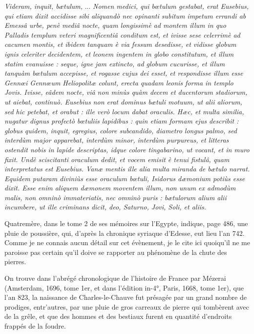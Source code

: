\documentclass[a4paper, 12pt, oneside, french]{article}
\begin{document}
\og \emph{Videram, inquit, bætulum,} ... \emph{Nomen medici, qui bœtulum gestabat, erat Eusebius, qui etiam dixit accidisse sibi aliquandò nec opinanti subitum impetum errandi ab Emessâ urbe, penè mediâ nocte, quam longissimè ad montem illum in quo Palladis templum veteri magnificentiâ conditum est, et ivisse sese celerrimè ad cacumen montis, et ibidem tanquam è via fessum desedisse, et vidisse globum ignis celeriter decidentem, et leonem ingentem in globo constitutum, et illum statim evanuisse : seque, igne jam extincto, ad globum cucurisse, et illum tanquàm bœtulum accepisse, et rogasse cujus dei esset, et respondisse illum esse Gennœi Gennœum Heliopolitæ colunt, erecta quadam leonis forma in templo Jovis. Ivisse, eâdem nocte, viâ non minùs quàm decem et ducentorum stadiorum, ut aiebat, continuò. Eusebius non erat dominus bætuli motuum, ut alii aliorum, sed hic petebat, et orabut : ille verò locum dabat oraculis. Hæc, et multa similia, nugatur dignus profectò bœtuliis lapidibus : quin etiam formam ejus describit : globus quidem, inquit, egregius, colore subcandido, diametro longus palmo, sed interdùm major apparebat, interdùm minor, interdùm purpureus, et litteras ostendit nobis in lapide descriptas, idque colore tingabarino, ut vocant, et in muro fixit. Undè sciscitanti oraculum dedit, et vocem emisit è tenui fistulâ, quam interpretatus est Eusebius. Vanæ mentis ille alia multa miranda de bætulo narrat. Equidem putaram diviniùs esse oraculum bœtuli, Isidorus dæmonium potiùs esse dixit. Esse enim aliquem dæmonem moventem illum, non unum ex admodùm malis, non omninò immateriatis, nec omninò puris : bætulorum alium alii incumbere, ut ille criminans dicit, deo, Saturno, Jovi, Soli, et aliis.} \fg

Quatremère, dans le tome 2 de ses mémoires sur l'Egypte, indique, page 486, une pluie de poussière, qui, d'après la chronique syriaque d'Edesse, eut lieu l'an 742. Comme je ne connais aucun détail sur cet évènement, je le cite ici quoiqu'il ne me paroisse pas certain qu'il doive se rapporter au phénomène de la chute des pierres.

On trouve dans l'abrégé chronologique de l'histoire de France par Mézerai (Amsterdam, 1696, tome 1er, et dans l'édition in-4°, Paris, 1668, tome 1er), que l'an 823, la naissance de Charles-le-Chauve fut présagée par un grand nombre de prodiges, entr'autres, par une pluie de gros carreaux de pierre qui tombèrent avec de la grêle, et que des hommes et des bestiaux furent en quantité d'endroits frappés de la foudre.
\end{document}
